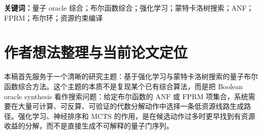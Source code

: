 \documentclass[UTF8,fontset=macnew,11pt]{ctexart}
\newcommand{\method}{Resource-NMCTS}
\newcommand{\anf}{\ensuremath{\mathrm{ANF}}}
\newcommand{\fprm}{\ensuremath{\mathrm{FPRM}}}
\newcommand{\mcts}{\ensuremath{\mathrm{MCTS}}}
\newcommand{\ttable}{truth-table}
\newcommand{\mct}{\ensuremath{\mathrm{MCT}}}
\begin{document}
\begin{abstract}
项集级 $n=20,22,24,28,32,36,40$ scale 实验表明，结构深度策略可以在接近 all-depth adaptive 质量的同时减少约三分之一时间；depth-frontier policy 在 $n=20,28,40$ 上相对 fixed depth-2 获得 35/0/37，平均 score 降低 2.19\%，相对 all-depth depth$\leq4$ 节省 58.69\% 时间。独立 seed 的 $n=24,28,32,40$ 泛化实验中，原 frontier policy 相对 fixed depth-2 为 40/0/56、平均 score 降低 1.85\%；扩大训练集后的 large frontier policy 在同一泛化集上提升到 56/0/40、平均 score 降低 2.34\%，相对旧 policy 为 17/0/79、平均 score 再降 0.49\%，相对 all-depth 仅高 0.10\% 且节省 53.50\% 时间。进一步加入时间感知标签目标 $score_{\Delta}+0.003\,time_{\Delta}$ 后，cost-aware frontier policy 在同一泛化集上仍相对 fixed depth-2 获得 56/0/40、平均 score 降低 1.39\%，但把相对 fixed depth-2 的 plan-time 增幅从 large policy 的 563.80\% 降至 170.03\%；相对 large policy，它以 +0.99\% score 代价换取 33.02\% 时间下降和 7.61\% 辅助线 lifetime area 下降。

所有 6600 个项集级方法行均通过 factor-plan \anf{} 展开验证和 emitted X/CNOT/\mct{} circuit 的 GF(2) 多项式符号模拟验证；进一步的 $n=21,22,23$ bridge、large-policy $n=23$ rerun 和 cost-aware $n=23$ rerun 中，300/300 个方法行同时通过完整 \ttable{} oracle 验证、plan 验证和 emitted-circuit 符号验证。新增 emitted-circuit schedule proxy 显示，large frontier policy 在 $n=23$ 完整 bridge 上相对旧 policy 为 1/0/5，平均 score 再降 0.48\%，T-depth proxy 再降 0.45\%；cost-aware policy 则相对 large policy 以 +0.92\% score 代价换取 56.29\% plan time 下降和 12.62\% lifetime area 下降。本文的阶段性结论是：\method{} 已形成一条独立于 SSHR、以低 T-count 和低加权逻辑资源为目标的 Boolean oracle synthesis 主线；但 RevKit API 结果表明，论文若要投稿为强算法贡献，还需要增加 phase/Rz-aware 口径并处理非 Clifford 旋转综合成本，或者明确限制 bit-flip oracle 目标，并继续补官方 ROS/mockturtle、legacy RevKit/CirKit 和后端相关评估。
\end{abstract}

\noindent\textbf{关键词：}量子 oracle 综合；布尔函数综合；强化学习；蒙特卡洛树搜索；ANF；FPRM；布尔环；资源约束编译

\section*{作者想法整理与当前论文定位}

本稿首先服务于一个清晰的研究主题：基于强化学习与蒙特卡洛树搜索的量子布尔函数综合方法。这个主题的本质不是复现某个已有综合算法，而是把 Boolean oracle synthesis 看作搜索问题：给定布尔函数的 \anf{} 或 \fprm{} 项集合，系统需要在大量可计算、可反算、可验证的代数分解动作中选择一条低资源线路生成路径。强化学习、神经排序和 \mcts{} 的作用，是在候选动作过多时更早找到有资源收益的分解，而不是直接生成不可解释的量子门序列。
\end{document}
